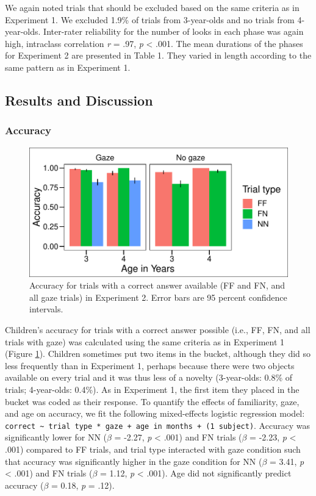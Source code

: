 \documentclass[english,,man]{apa6}
\begin{document}
We again noted trials that should be excluded based on the same criteria
as in Experiment 1. We excluded 1.9\% of trials from 3-year-olds and no
trials from 4-year-olds. Inter-rater reliability for the number of looks
in each phase was again high, intraclass correlation \emph{r} = .97,
\emph{p} \textless{} .001. The mean durations of the phases for
Experiment 2 are presented in Table 1. They varied in length according
to the same pattern as in Experiment 1.

\subsection{Results and Discussion}\label{results-and-discussion-1}

\subsubsection{Accuracy}\label{accuracy-1}

\begin{figure}
\centering
\includegraphics{figs/acce2-1.pdf}
\caption{\label{fig:acce2}Accuracy for trials with a correct answer
available (FF and FN, and all gaze trials) in Experiment 2. Error bars
are 95 percent confidence intervals.}
\end{figure}

Children's accuracy for trials with a correct answer possible (i.e., FF,
FN, and all trials with gaze) was calculated using the same criteria as
in Experiment 1 (Figure \ref{fig:acce2}). Children sometimes put two
items in the bucket, although they did so less frequently than in
Experiment 1, perhaps because there were two objects available on every
trial and it was thus less of a novelty (3-year-olds: 0.8\% of trials;
4-year-olds: 0.4\%). As in Experiment 1, the first item they placed in
the bucket was coded as their response. To quantify the effects of
familiarity, gaze, and age on accuracy, we fit the following
mixed-effects logistic regression model:
\texttt{correct\ \textasciitilde{}\ trial\ type\ *\ gaze\ +\ age\ in\ months\ +\ (1\textbar{}\ subject)}.
Accuracy was significantly lower for NN (\(\beta\) = -2.27, \emph{p}
\textless{} .001) and FN trials (\(\beta\) = -2.23, \emph{p} \textless{}
.001) compared to FF trials, and trial type interacted with gaze
condition such that accuracy was significantly higher in the gaze
condition for NN (\(\beta\) = 3.41, \emph{p} \textless{} .001) and FN
trials (\(\beta\) = 1.12, \emph{p} \textless{} .001). Age did not
significantly predict accuracy (\(\beta\) = 0.18, \emph{p} = .12).
\end{document}
